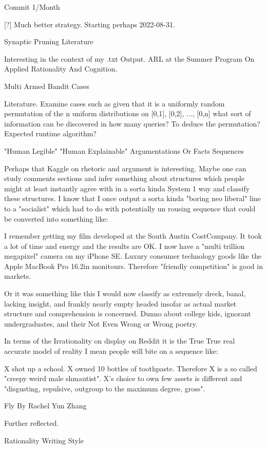 	Commit 1/Month

[?] Much better strategy. Starting perhaps 2022-08-31.

	Synaptic Pruning Literature

Interesting in the context of my .txt Output. ARL at the Summer Program On Applied Rationality And Cognition.

	Multi Armed Bandit Cases

Literature. Examine cases such as given that it is a uniformly random permutation of the n uniform distributions on [0,1], [0,2], ..., [0,n] what sort of information can be discovered in how many queries? To deduce the permutation? Expected runtime algorithm?

	"Human Legible" "Human Explainable" Argumentations Or Facts Sequences

Perhaps that Kaggle on rhetoric and argument is interesting. Maybe one can study comments sections and infer something about structures which people might at least instantly agree with in a sorta kinda System 1 way and classify these structures. I know that I once output a sorta kinda "boring neo liberal" line to a "socialist" which had to do with potentially un rousing sequence that could be converted into something like:

I remember getting my film developed at the South Austin CostCompany.
It took a lot of time and energy and the results are OK.
I now have a "multi trillion megapixel" camera on my iPhone SE.
Luxury consumer technology goods like the Apple MacBook Pro 16.2in monitours.
Therefore "friendly competition" is good in markets.

Or it was something like this I would now classify as extremely dreck, banal, lacking insight, and frankly nearly empty headed insofar as actual market structure and comprehension is concerned. Dunno about college kids, ignorant undergraduates, and their Not Even Wrong or Wrong poetry.

In terms of the Irrationality on display on Reddit it is the True True real accurate model of reality I mean people will bite on a sequence like:

X shot up a school.
X owned 10 bottles of toothpaste.
Therefore X is a so called "creepy weird male shmautist".
X's choice to own few assets is different and "disgusting, repulsive, outgroup to the maximum degree, gross".

	Fly By Rachel Yun Zhang

Further reflected.

	Rationality Writing Style

